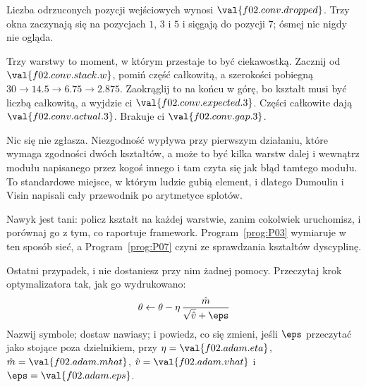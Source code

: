 \begin{fr}
\begin{ansblock}
Liczba odrzuconych pozycji wejściowych wynosi $\val{f02.conv.dropped}$. Trzy
okna zaczynają się na pozycjach $1$, $3$ i $5$ i sięgają do pozycji $7$; ósmej
nic nigdy nie ogląda.

Trzy warstwy to moment, w którym przestaje to być ciekawostką. Zacznij od
$\val{f02.conv.stack.w}$, pomiń część całkowitą, a szerokości pobiegną
$30 \to \num{14.5} \to \num{6.75} \to \num{2.875}$. Zaokrąglij to na końcu w
górę, bo kształt musi być liczbą całkowitą, a wyjdzie ci
$\val{f02.conv.expected.3}$. Części całkowite dają
$\val{f02.conv.actual.3}$. Brakuje ci $\val{f02.conv.gap.3}$.
\end{ansblock}

\begin{warning}
Nic się nie zgłasza. Niezgodność wypływa przy pierwszym działaniu, które
wymaga zgodności dwóch kształtów, a może to być kilka warstw dalej i wewnątrz
modułu napisanego przez kogoś innego \dash{} i tam czyta się jak błąd tamtego
modułu. To standardowe miejsce, w którym ludzie gubią element, i dlatego
Dumoulin i Visin napisali cały przewodnik po arytmetyce splotów.

Nawyk jest tani: policz kształt na każdej warstwie, zanim cokolwiek uruchomisz,
i porównaj go z tym, co raportuje framework. Program~\ref{prog:P03} wymiaruje
w ten sposób sieć, a Program~\ref{prog:P07} czyni ze sprawdzania kształtów
dyscyplinę.
\end{warning}

Ostatni przypadek, i nie dostaniesz przy nim żadnej pomocy. Przeczytaj krok
optymalizatora tak, jak go wydrukowano:
\[ \theta \leftarrow \theta - \eta \, \frac{\hat{m}}{\sqrt{\hat{v}} + \eps} \]
Nazwij symbole; dostaw nawiasy; i powiedz, co się zmieni, jeśli $\eps$
przeczytać jako stojące poza dzielnikiem, przy $\eta = \val{f02.adam.eta}$,
$\hat{m} = \val{f02.adam.mhat}$, $\hat{v} = \val{f02.adam.vhat}$ i
$\eps = \val{f02.adam.eps}$.
\dotline
\nextframe
\end{fr}

